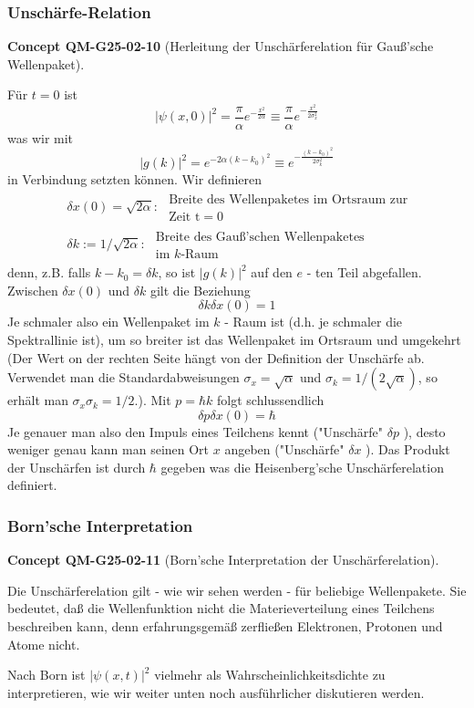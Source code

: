 \documentclass[10pt, letterpaper]{article}
\newcommand{\CustomHeading}[3]{%
  \par\medskip\noindent%
  \textbf{#1 #2} \textnormal{(#3)}.\enskip%
}
\newenvironment{CONC}[2]{\begin{unitbox}\CustomHeading{Concept}{#1}{#2}}{\end{unitbox}}
\begin{document}
\subsubsection*{Unschärfe-Relation}


\begin{CONC}{QM-G25-02-10}{Herleitung der Unschärferelation für Gauß'sche Wellenpaket}
Für $t=0$ ist
$$
|\psi(x, 0)|^{2}=\frac{\pi}{\alpha} e^{-\frac{x^{2}}{2 \alpha}} \equiv \frac{\pi}{\alpha} e^{-\frac{x^{2}}{2 \sigma_{x}^{2}}}
$$
was wir mit
$$
|g(k)|^{2}=e^{-2 \alpha\left(k-k_{0}\right)^{2}} \equiv e^{-\frac{\left(k-k_{0}\right)^{2}}{2 \sigma_{k}^{2}}}
$$
in Verbindung setzten können. Wir definieren
$$
\begin{aligned}
& \delta x(0)=\sqrt{2 \alpha}: \begin{array}{l}
\text { Breite des Wellenpaketes im Ortsraum zur } \\
\text { Zeit } \mathrm{t}=0
\end{array} \\
& \delta k:=1 / \sqrt{2 \alpha}: \begin{array}{l}
\text { Breite des Gauß'schen Wellenpaketes } \\
\text { im } k \text {-Raum }
\end{array}
\end{aligned}
$$
denn, z.B. falls $k-k_{0}=\delta k$, so ist $|g(k)|^{2}$ auf den $e$ - ten Teil abgefallen. Zwischen $\delta x(0)$ und $\delta k$ gilt die Beziehung
$$
\delta k \delta x(0)=1
$$
Je schmaler also ein Wellenpaket im $k$ - Raum ist (d.h. je schmaler die Spektrallinie ist), um so breiter ist das Wellenpaket im Ortsraum und umgekehrt (Der Wert on der rechten Seite hängt von der Definition der Unschärfe ab. Verwendet man die Standardabweisungen $\sigma_x=\sqrt{\alpha}$ und $\sigma_k=1 /(2 \sqrt{\alpha})$, so erhält man $\sigma_x \sigma_k=1 / 2$.). Mit $p=\hbar k$ folgt schlussendlich
$$
\delta p \delta x(0)=\hbar
$$
Je genauer man also den Impuls eines Teilchens kennt ("Unschärfe" $\delta p$ ), desto weniger genau kann man seinen Ort $x$ angeben ("Unschärfe" $\delta x$ ). Das Produkt der Unschärfen ist durch $\hbar$ gegeben was die Heisenberg'sche Unschärferelation definiert.
\end{CONC}

\subsubsection*{Born'sche Interpretation}


\begin{CONC}{QM-G25-02-11}{Born'sche Interpretation der Unschärferelation}
Die Unschärferelation gilt - wie wir sehen werden - für beliebige Wellenpakete. Sie bedeutet, daß die Wellenfunktion nicht die Materieverteilung eines Teilchens beschreiben kann, denn erfahrungsgemäß zerfließen Elektronen, Protonen und Atome nicht.

Nach Born ist $|\psi(x, t)|^{2}$ vielmehr als Wahrscheinlichkeitsdichte zu interpretieren, wie wir weiter unten noch ausführlicher diskutieren werden.
\end{CONC}
\end{document}
